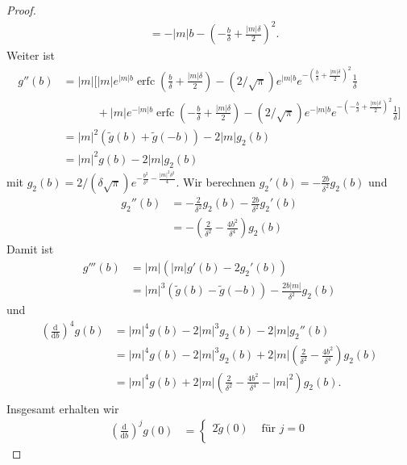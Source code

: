 \documentclass[12pt,a4paper]{scrartcl}
\newcommand{\dd}{\mathrm{d}}
\numberwithin{equation}{section}
\newcommand{\erfc}{\operatorname{erfc}}
\begin{document}
\begin{proof}
\begin{align*}
&=-|m|b -\left(-\frac{b}{\delta}+\frac{|m|\delta}{2}\right)^2.
\end{align*}
Weiter ist
\begin{align*}
g''(b) &= |m|\bigg[ |m|e^{|m|b} \erfc \left(\frac{b}{\delta}+ \frac{ |m|\delta}{2}\right) 
-(2/\sqrt{\pi}) e^{|m|b} e^{- \left(\frac{b}{\delta}+ \frac{ |m|\delta}{2}\right)^2}  \frac{1}{\delta} \\
& \quad \qquad +|m| e^{-|m| b} \erfc \left( - \frac{b}{\delta}+ \frac{|m| \delta}{2} \right) 
-(2/\sqrt{\pi}) e^{-|m| b} e^{- \left( - \frac{b}{\delta}+ \frac{|m| \delta}{2} \right)^2} \frac{1}{\delta} \bigg] \\
&=|m|^2(\tilde g(b) + \tilde g(-b)) - 2 |m| g_2(b) \\
&=|m|^2 g(b) - 2|m| g_2(b)
\end{align*}
mit $g_2(b)= 2 / (\delta\sqrt{\pi}) e^{-\frac{b^2}{\delta^2}-\frac{|m|^2\delta^2}{4}}$.
Wir berechnen $g_2'(b)=-\frac{2b}{\delta^2}g_2(b)$ und
\begin{align*}
g_2''(b) &= -\frac{2}{\delta^2}g_2(b) - \frac{2b}{\delta^2}g_2'(b)  \\
&=  -\left(\frac{2}{\delta^2} - \frac{4b^2}{\delta^4} \right)g_2(b)
\end{align*}
Damit ist 
\begin{align*}
g'''(b)&=|m|(|m|g'(b)-2g_2'(b)) \\
&= |m|^3 (\tilde g(b) - \tilde g(-b)) - \frac{2b |m|}{\delta^2}g_2(b)
\end{align*}
und 
\begin{align*}
\left(\frac{\dd}{\dd b} \right)^4 g(b) &= |m|^4 g(b) - 2|m|^3 g_2(b) -2 |m| g_2''(b) \\
&= |m|^4 g(b) - 2|m|^3 g_2(b) +  2 |m| \left(\frac{2}{\delta^2} - \frac{4b^2}{\delta^4} \right)g_2(b) \\
&= |m|^4 g(b) +  2 |m| \left(\frac{2}{\delta^2} - \frac{4b^2}{\delta^4} - |m|^2 \right)g_2(b). \\
\end{align*}
Insgesamt erhalten wir
\begin{align*}
\left( \frac{\dd}{\dd b}\right)^j g(0)&=\begin{cases}
2 \tilde g(0) &\text{ für } j=0\\

\end{cases}
\end{align*}
\end{proof}
\end{document}
